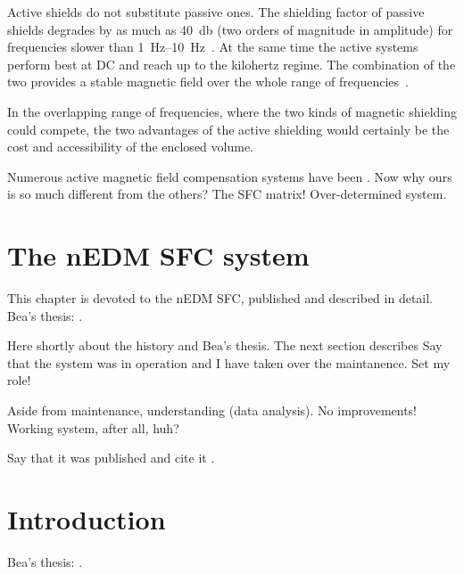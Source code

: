 Active shields do not substitute passive ones. The shielding factor
 of passive shields degrades by as much as \SI{40}{\decibel} (two orders of magnitude in amplitude) for frequencies slower than \SIrange[range-phrase = --]{1}{10}{\hertz}~\cite{Brake1991}. At the same time the active systems perform best at DC and reach up to the kilohertz regime. The combination of the two provides a stable magnetic field over the whole range of frequencies~\cite{Kelha1982,Brake1991,Voigt2013}.

In the overlapping range of frequencies, where the two kinds of magnetic shielding could compete, the two advantages of the active shielding would certainly be the cost and accessibility of the enclosed volume. 

Numerous active magnetic field compensation systems have been \cite{Kelha1982,Brake1991,RetaHernandez1998,Spemann2003,Brys2005,Kobayashi2012,Voigt2013,Afach2014}. Now why ours is so much different from the others? The SFC matrix! Over-determined system.


\section{The nEDM SFC system}
This chapter is devoted to the nEDM SFC, published \cite{Afach2014} and described in detail. Bea's thesis: \cite{Franke2013}.

Here shortly about the history and Bea's thesis. The next section describes Say that the system was in operation and I have taken over the maintanence. Set my role!

Aside from maintenance, understanding (data analysis). No improvements! Working system, after all, huh?

Say that it was published and cite it \cite{Afach2014}.




\section{Introduction}
Bea's thesis: \cite{Franke2013}.

